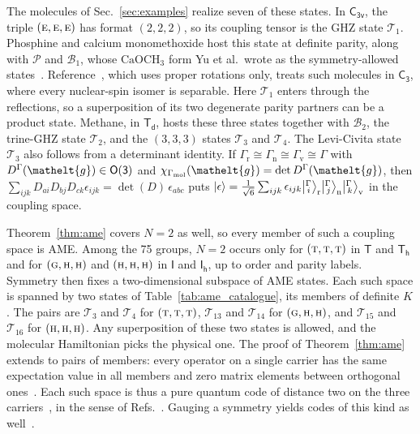 \documentclass[
  reprint,
  aps,
  prx,
  superscriptaddress,
  amsmath,
  amssymb,
  longbibliography
]{revtex4-2}
\newcommand{\eltfont}[1]{{\let\sigma\eltsigma\mathelt{#1}}}
\newcommand{\grp}[1]{\mathsf{#1}}
\newcommand{\irr}[1]{\text{\normalfont\scshape #1}}
\newcommand{\elt}[1]{\eltfont{#1}}
\newcommand{\repD}[1]{D^{#1}}
\newcommand{\irchar}[1]{\chi_{#1}}
\newcommand{\irket}[2]{\bigl\lvert{}^{#1}_{\,#2}\bigr\rangle}
\newcommand{\gel}{\elt{g}}             %
\providecommand{\Gmol}{\Gamma_{\mathrm{mol}}}
\providecommand{\Grot}{\Gamma_{\mathrm{r}}}
\providecommand{\Gvib}{\Gamma_{\mathrm{v}}}
\providecommand{\Gspin}{\Gamma_{\mathrm{n}}}
\newcommand{\catP}{\mathcal{P}}
\newcommand{\catB}[1]{\mathcal{B}_{#1}}
\newcommand{\catT}[1]{\mathcal{T}_{#1}}
\begin{document}
The molecules of Sec.~\ref{sec:examples} realize seven of these states. In $\grp{C_{3v}}$, the triple $(\irr{e},\irr{e},\irr{e})$ has format $(2,2,2)$, so its coupling tensor is the GHZ state $\catT{1}$. Phosphine and calcium monomethoxide host this state at definite parity, along with $\catP$ and $\catB{1}$, whose $\mathrm{CaOCH_3}$ form Yu et al.\ wrote as the symmetry-allowed states~\cite{Yu2019, YuHutzler2021}. Reference~\cite{albert2025quantumtheorymolecularorientations}, which uses proper rotations only, treats such molecules in $\grp{C_{3}}$, where every nuclear-spin isomer is separable. Here $\catT{1}$ enters through the reflections, so a superposition of its two degenerate parity partners can be a product state. Methane, in $\grp{T_{d}}$, hosts these three states together with $\catB{2}$, the trine-GHZ state $\catT{2}$, and the $(3,3,3)$ states $\catT{3}$ and $\catT{4}$. The Levi-Civita state $\catT{3}$ also follows from a determinant identity. If $\Grot\cong\Gspin\cong\Gvib\cong\Gamma$ with $\repD{\Gamma}(\gel)\in\grp{O(3)}$ and $\irchar{\Gmol}(\gel)=\det\repD{\Gamma}(\gel)$, then $\sum_{ijk}D_{ai}D_{bj}D_{ck}\epsilon_{ijk}=\det(D)\,\epsilon_{abc}$ puts $\ket{\epsilon}=\tfrac{1}{\sqrt{6}}\sum_{ijk}\epsilon_{ijk}\irket{\Gamma}{i}_{\mathrm r}\irket{\Gamma}{j}_{\mathrm n}\irket{\Gamma}{k}_{\mathrm v}$ in the coupling space.

Theorem~\ref{thm:ame} covers $N=2$ as well, so every member of such a coupling space is AME. Among the 75 groups, $N=2$ occurs only for $(\irr{t},\irr{t},\irr{t})$ in $\grp{T}$ and $\grp{T_{h}}$ and for $(\irr{g},\irr{h},\irr{h})$ and $(\irr{h},\irr{h},\irr{h})$ in $\grp{I}$ and $\grp{I_{h}}$, up to order and parity labels. Symmetry then fixes a two-dimensional subspace of AME states. 
Each such space is spanned by two states of Table~\ref{tab:ame_catalogue}, its members of definite $K$. The pairs are $\catT{3}$ and $\catT{4}$ for $(\irr{t},\irr{t},\irr{t})$, $\catT{13}$ and $\catT{14}$ for $(\irr{g},\irr{h},\irr{h})$, and $\catT{15}$ and $\catT{16}$ for $(\irr{h},\irr{h},\irr{h})$. Any superposition of these two states is allowed, and the molecular Hamiltonian picks the physical one. The proof of Theorem~\ref{thm:ame} extends to pairs of members: every operator on a single carrier has the same expectation value in all members and zero matrix elements between orthogonal ones~\cite{Knill1997}. Each such space is thus a pure quantum code of distance two on the three carriers~\cite{DasRepo2026}, in the sense of Refs.~\cite{Scott2004, HuberGrassl2020, WangFeng2012}. Gauging a symmetry yields codes of this kind as well~\cite{BLRV2019}.
\end{document}
